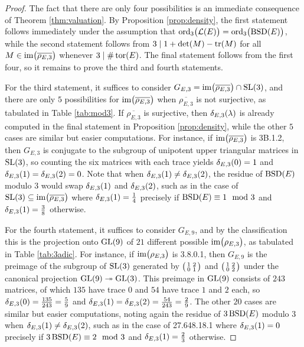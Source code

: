 \documentclass{article}
\theoremstyle{plain}
\theoremstyle{definition}
\newcommand{\BSD}{\operatorname{BSD}}
\newcommand{\GL}{\operatorname{GL}}
\newcommand{\im}{\operatorname{im}}
\newcommand{\LLL}{\mathcal{L}}
\newcommand{\ord}{\operatorname{ord}}
\newcommand{\SL}{\operatorname{SL}}
\newcommand{\tor}{\operatorname{tor}}
\newcommand{\tr}{\operatorname{tr}}
\newcommand{\br}{\!\del}
\newcommand{\twobytwosmall}[4]{\begin{psmallmatrix} #1 & #2 \\ #3 & #4 \end{psmallmatrix}}
\begin{document}
\begin{proof}
The fact that there are only four possibilities is an immediate consequence of Theorem \ref{thm:valuation}. By Proposition \ref{prop:density}, the first statement follows immediately under the assumption that $ \ord_3\br{\LLL\br{E}} = \ord_3\br{\BSD\br{E}} $, while the second statement follows from $ 3 \mid 1 + \det\br{M} - \tr\br{M} $ for all $ M \in \im\br{\overline{\rho_{E, 3}}} $ whenever $ 3 \mid \#\tor\br{E} $. The final statement follows from the first four, so it remains to prove the third and fourth statements.

For the third statement, it suffices to consider $ G_{E, 3} = \im\br{\overline{\rho_{E, 3}}} \cap \SL\br{3} $, and there are only $ 5 $ possibilities for $ \im\br{\overline{\rho_{E, 3}}} $ when $ \overline{\rho_{E, 3}} $ is not surjective, as tabulated in Table \ref{tab:mod3}. If $ \overline{\rho_{E, 3}} $ is surjective, then $ \delta_{E, 3}\br{\lambda} $ is already computed in the final statement in Proposition \ref{prop:density}, while the other $ 5 $ cases are similar but easier computations. For instance, if $ \im\br{\overline{\rho_{E, 3}}} $ is 3B.1.2, then $ G_{E, 3} $ is conjugate to the subgroup of unipotent upper triangular matrices in $ \SL\br{3} $, so counting the six matrices with each trace yields $ \delta_{E, 3}\br{0} = 1 $ and $ \delta_{E, 3}\br{1} = \delta_{E, 3}\br{2} = 0 $. Note that when $ \delta_{E, 3}\br{1} \ne \delta_{E, 3}\br{2} $, the residue of $ \BSD\br{E} $ modulo $ 3 $ would swap $ \delta_{E, 3}\br{1} $ and $ \delta_{E, 3}\br{2} $, such as in the case of $ \SL\br{3} \subseteq \im\br{\overline{\rho_{E, 3}}} $ where $ \delta_{E, 3}\br{1} = \tfrac{1}{4} $ precisely if $ \BSD\br{E} \equiv 1 \mod 3 $ and $ \delta_{E, 3}\br{1} = \tfrac{3}{8} $ otherwise.

For the fourth statement, it suffices to consider $ G_{E, 9} $, and by the classification this is the projection onto $ \GL\br{9} $ of $ 21 $ different possible $ \im\br{\rho_{E, 3}} $, as tabulated in Table \ref{tab:3adic}. For instance, if $ \im\br{\rho_{E, 3}} $ is 3.8.0.1, then $ G_{E, 9} $ is the preimage of the subgroup of $ \SL\br{3} $ generated by $ \twobytwosmall{1}{2}{0}{1} $ and $ \twobytwosmall{1}{2}{0}{2} $ under the canonical projection $ \GL\br{9} \twoheadrightarrow \GL\br{3} $. This preimage in $ \GL\br{9} $ consists of $ 243 $ matrices, of which $ 135 $ have trace $ 0 $ and $ 54 $ have trace $ 1 $ and $ 2 $ each, so $ \delta_{E, 3}\br{0} = \tfrac{135}{243} = \tfrac{5}{9} $ and $ \delta_{E, 3}\br{1} = \delta_{E, 3}\br{2} = \tfrac{54}{243} = \tfrac{2}{9} $. The other $ 20 $ cases are similar but easier computations, noting again the residue of $ 3\BSD\br{E} $ modulo $ 3 $ when $ \delta_{E, 3}\br{1} \ne \delta_{E, 3}\br{2} $, such as in the case of 27.648.18.1 where $ \delta_{E, 3}\br{1} = 0 $ precisely if $ 3\BSD\br{E} \equiv 2 \mod 3 $ and $ \delta_{E, 3}\br{1} = \tfrac{2}{3} $ otherwise.
\end{proof}
\end{document}
